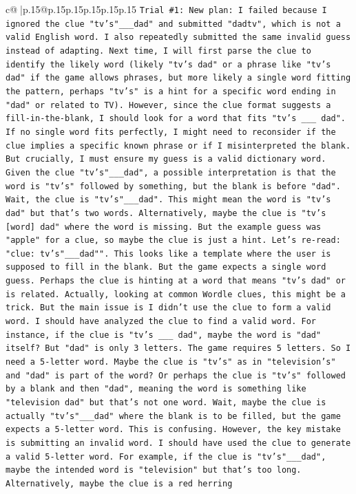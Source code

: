 \documentclass{article}
\begin{document}
{\begin{supertabular}{c@{$\;$}|p{.15\linewidth}@{}p{.15\linewidth}p{.15\linewidth}p{.15\linewidth}p{.15\linewidth}p{.15\linewidth}}
{{{\texttt{Trial \#1: New plan: I failed because I ignored the clue "tv's"\_\_\_dad" and submitted "dadtv", which is not a valid English word. I also repeatedly submitted the same invalid guess instead of adapting. Next time, I will first parse the clue to identify the likely word (likely "tv's dad" or a phrase like "tv's dad" if the game allows phrases, but more likely a single word fitting the pattern, perhaps "tv's" is a hint for a specific word ending in "dad" or related to TV). However, since the clue format suggests a fill{-}in{-}the{-}blank, I should look for a word that fits "tv's \_\_\_ dad". If no single word fits perfectly, I might need to reconsider if the clue implies a specific known phrase or if I misinterpreted the blank. But crucially, I must ensure my guess is a valid dictionary word. Given the clue "tv's"\_\_\_dad", a possible interpretation is that the word is "tv's" followed by something, but the blank is before "dad". Wait, the clue is "tv's"\_\_\_dad". This might mean the word is "tv's dad" but that's two words. Alternatively, maybe the clue is "tv's {[}word{]} dad" where the word is missing. But the example guess was "apple" for a clue, so maybe the clue is just a hint. Let's re{-}read: "clue: tv's"\_\_\_dad"". This looks like a template where the user is supposed to fill in the blank. But the game expects a single word guess. Perhaps the clue is hinting at a word that means "tv's dad" or is related. Actually, looking at common Wordle clues, this might be a trick. But the main issue is I didn't use the clue to form a valid word. I should have analyzed the clue to find a valid word. For instance, if the clue is "tv's \_\_\_ dad", maybe the word is "dad" itself? But "dad" is only 3 letters. The game requires 5 letters. So I need a 5{-}letter word. Maybe the clue is "tv's" as in "television's" and "dad" is part of the word? Or perhaps the clue is "tv's" followed by a blank and then "dad", meaning the word is something like "television dad" but that's not one word. Wait, maybe the clue is actually "tv's"\_\_\_dad" where the blank is to be filled, but the game expects a 5{-}letter word. This is confusing. However, the key mistake is submitting an invalid word. I should have used the clue to generate a valid 5{-}letter word. For example, if the clue is "tv's"\_\_\_dad", maybe the intended word is "television" but that's too long. Alternatively, maybe the clue is a red herring} \\
\\ 
}}}
\end{supertabular}}
\end{document}
